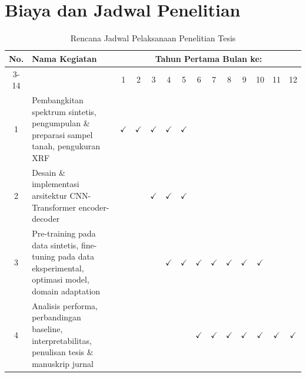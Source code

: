 \documentclass[12pt, a4paper]{article}
\begin{document}

\section{Biaya dan Jadwal Penelitian}
\begin{table}[H]
\centering
\caption{Rencana Jadwal Pelaksanaan Penelitian Tesis}
\small
\begin{tabular}{|c|p{6cm}|*{12}{c|}}
\hline
\multirow{2}{*}{No.} & \multirow{2}{*}{\centering Nama Kegiatan} & \multicolumn{12}{c|}{Tahun Pertama Bulan ke:} \\
\cline{3-14}
& & 1 & 2 & 3 & 4 & 5 & 6 & 7 & 8 & 9 & 10 & 11 & 12 \\
\hline
1 & Pembangkitan spektrum sintetis, pengumpulan \& preparasi sampel tanah, pengukuran XRF & $\checkmark$ & $\checkmark$ & $\checkmark$ & $\checkmark$ & $\checkmark$ & & & & & & & \\
\hline
2 & Desain \& implementasi arsitektur CNN-Transformer encoder-decoder & & & $\checkmark$ & $\checkmark$ & $\checkmark$ & & & & & & & \\
\hline
3 & Pre-training pada data sintetis, fine-tuning pada data eksperimental, optimasi model, domain adaptation & & & & $\checkmark$ & $\checkmark$ & $\checkmark$ & $\checkmark$ & $\checkmark$ & $\checkmark$ & $\checkmark$ & & \\
\hline
4 & Analisis performa, perbandingan baseline, interpretabilitas, penulisan tesis \& manuskrip jurnal & & & & & & $\checkmark$ & $\checkmark$ & $\checkmark$ & $\checkmark$ & $\checkmark$ & $\checkmark$ & $\checkmark$ \\
\hline
\end{tabular}
\end{table}

\renewcommand{\bibsection}{\section{Daftar Pustaka}}


\end{document}
